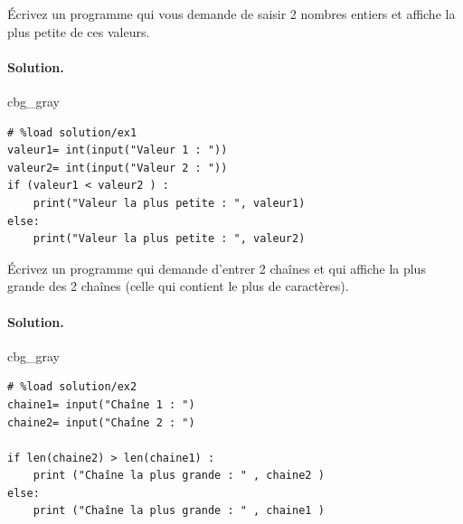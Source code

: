\documentclass[%
oneside,                 %
final,                   %
10pt,french]{article}
\newenvironment{_cod_tight}[1]{
   \def\FrameCommand{\colorbox{#1}}
   \FrameRule0.6pt\MakeFramed {\FrameRestore}\vskip3mm}
   {\vskip0mm\endMakeFramed}
\newenvironment{cod}[1]{
\bgroup\rmfamily
\fboxsep=0mm\relax
\begin{_cod_tight}{#1}
\list{}{\parsep=-2mm\parskip=0mm\topsep=0pt\leftmargin=2mm
\rightmargin=2\leftmargin\leftmargin=4pt\relax}
\item\relax}
{\endlist\end{_cod_tight}\egroup}
\newenvironment{doconceexercise}{}{}
\newcounter{doconceexercisecounter}
\begin{document}
\begin{doconceexercise}



Écrivez un programme qui vous demande de saisir 2 nombres entiers et affiche la plus petite de ces valeurs.


\paragraph{Solution.}
\begin{cod}{cbg_gray}\begin{verbatim}
# %load solution/ex1
valeur1= int(input("Valeur 1 : "))
valeur2= int(input("Valeur 2 : "))
if (valeur1 < valeur2 ) :
    print("Valeur la plus petite : ", valeur1)
else:
    print("Valeur la plus petite : ", valeur2)
\end{verbatim}
\end{cod}
\noindent


\end{doconceexercise}




\begin{doconceexercise}



Écrivez un programme qui demande d'entrer 2 chaînes et qui affiche la plus grande des 2 chaînes (celle qui contient le plus de caractères).


\paragraph{Solution.}
\begin{cod}{cbg_gray}\begin{verbatim}
# %load solution/ex2
chaine1= input("Chaîne 1 : ")
chaine2= input("Chaîne 2 : ")

if len(chaine2) > len(chaine1) :
    print ("Chaîne la plus grande : " , chaine2 )
else:
    print ("Chaîne la plus grande : " , chaine1 )
\end{verbatim}
\end{cod}
\noindent


\end{doconceexercise}
\end{document}
